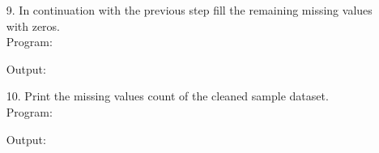 \documentclass[a4paper,11pt,openright]{report}
\begin{document}
\begin{enumerate}
\item[9.] In continuation with the previous step fill the remaining missing values with
zeros. \\

Program:


\vspace{5px}

Output:


\vspace{5px}

\item[10.] Print the missing values count of the cleaned sample dataset. \\ 	

Program:


\vspace{5px}

Output:


\end{enumerate}
\end{document}
